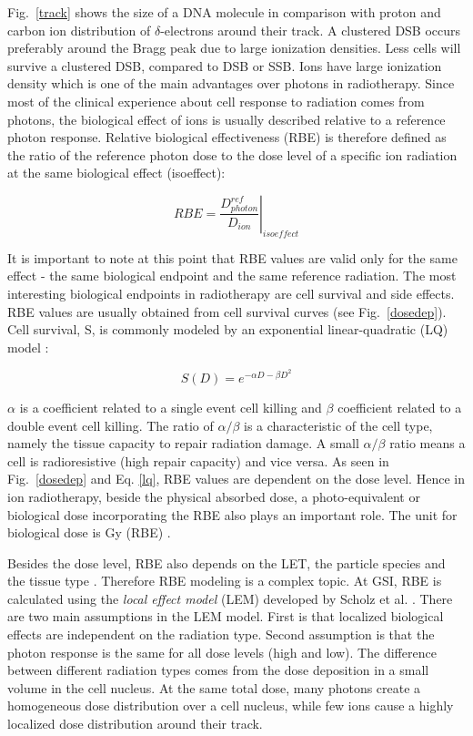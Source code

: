 Fig.~\ref{track} shows the size of a DNA molecule in comparison with proton and carbon ion distribution of $\delta$-electrons around their track. 
A clustered DSB occurs preferably around the Bragg peak due to large ionization densities. Less cells will survive a clustered DSB, compared to DSB or SSB. Ions have large ionization density which is one of the main advantages over photons in radiotherapy. Since most of the clinical experience about
cell response to radiation comes from photons, the biological effect of ions is usually described relative to a reference photon response. Relative biological effectiveness (RBE) is therefore defined as the ratio of the reference 
photon dose to the dose level of a specific ion radiation at the same biological effect (isoeffect):

\begin{equation}
 RBE = \left.\frac{D^{ref}_{photon}}{D_{ion}} \right|_{isoeffect}
\end{equation}

It is important to note at this point that RBE values are valid only for the same effect - the same biological endpoint and the same reference radiation. The most interesting biological endpoints in radiotherapy are cell survival and
side effects. RBE values are usually obtained from cell survival curves (see Fig.~\ref{dosedep}). Cell survival, S, is commonly modeled by an exponential linear-quadratic (LQ) model \cite{Fowler1989}:

\begin{equation}
 S(D) = e^{-\alpha D - \beta D^2}
 \label{lq}
\end{equation}

$\alpha$ is a coefficient related to a single event cell killing and $\beta$ coefficient related to a double event cell killing. The ratio of $\alpha / \beta$ is a characteristic of the cell type, namely the tissue 
capacity to repair radiation damage. A small $\alpha / \beta$ ratio means a cell is radioresistive (high repair capacity) and vice versa.
As seen in Fig.~\ref{dosedep} and Eq. \ref{lq}, RBE values are dependent on the dose level. Hence in ion radiotherapy, beside the physical absorbed dose, a photo-equivalent or biological dose incorporating the RBE also plays an important role. 
The unit for biological dose is Gy (RBE) \cite{ICRU2007}. 

Besides the dose level, RBE also depends on the LET, the particle species and the tissue type \cite{Kraft2000}. Therefore RBE modeling is a complex topic.
At GSI, RBE is calculated using the \textit{local effect model} (LEM) developed by Scholz et al. \cite{Scholz1994}. There are two main assumptions in the LEM model. First is that localized biological 
effects are independent on the radiation type. Second assumption is that the photon response is the same for all dose levels (high and low).
The difference between different radiation types comes from the dose deposition in a small volume in the cell nucleus.
At the same total dose, many photons create a homogeneous dose distribution over a cell nucleus, while few ions cause a highly localized dose distribution around their track.

